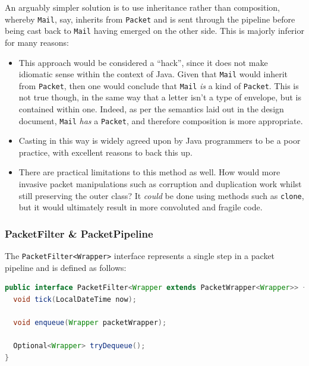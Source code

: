 An arguably simpler solution is to use inheritance rather than composition, whereby \texttt{Mail}, say, inherits from
\texttt{Packet} and is sent through the pipeline before being cast back to \texttt{Mail} having emerged on the other
side. This is majorly inferior for many reasons:
\begin{itemize}
    \item This approach would be considered a ``hack'', since it does not make idiomatic sense within the context of
    Java. Given that \texttt{Mail} would inherit from \texttt{Packet}, then one would conclude that \texttt{Mail}
    \emph{is} a kind of \texttt{Packet}. This is not true though, in the same way that a letter isn't a type of
    envelope, but is contained within one. Indeed, as per the semantics laid out in the design document,
    \texttt{Mail} \emph{has} a \texttt{Packet}, and therefore composition is more appropriate.
    \item Casting in this way is widely agreed upon by Java programmers to be a poor practice, with excellent reasons
    to back this up\cite{reddit_casting, yegor_bugayenko_casting, mark_casting, dennis_sosnoski_casting,
        erik_dietrich_casting}.
    \item There are practical limitations to this method as well. How would more invasive packet manipulations such
    as corruption and duplication work whilst still preserving the outer class? It \emph{could} be done using
    methods such as \texttt{clone}\cite{java_clone}, but it would ultimately result in more convoluted and fragile
    code\cite{java_avoid_clone}.
\end{itemize}

\subsubsection{PacketFilter \& PacketPipeline}\label{subsubsection:packet_filter_and_packet_pipeline}

The \texttt{PacketFilter<Wrapper>} interface represents a single step in a packet pipeline and is defined as follows:
\begin{lstlisting}[language=Java,caption={The \texttt{PacketFilter<Wrapper>} interface exactly as it appears in the
codebase.},label={code:packet_filter_interface},captionpos=b]
public interface PacketFilter<Wrapper extends PacketWrapper<Wrapper>> {
  void tick(LocalDateTime now);

  void enqueue(Wrapper packetWrapper);

  Optional<Wrapper> tryDequeue();
}
\end{lstlisting}

